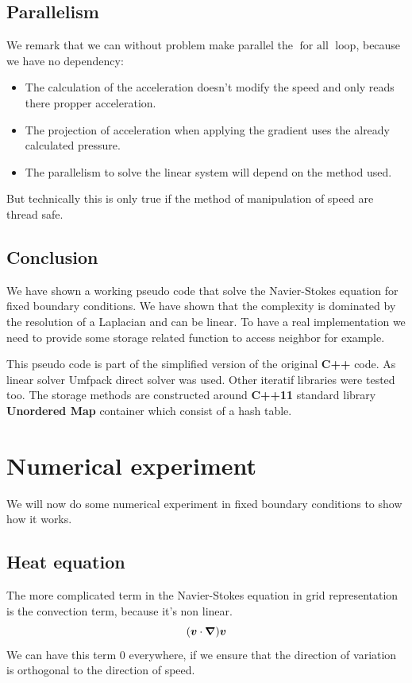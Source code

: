 \subsection{Parallelism}

We remark that we can without problem make parallel the $\mathop{\textbf{for all}}$ loop, because we have no dependency:
\begin{itemize}
 \item The calculation of the acceleration doesn't modify the speed and only reads there propper acceleration.
 \item The projection of acceleration when applying the gradient uses the already calculated pressure.
 \item The parallelism to solve the linear system will depend on the method used.
\end{itemize}

But technically this is only true if the method of manipulation of speed are thread safe.

\subsection{Conclusion}

We have shown a working pseudo code that solve the Navier-Stokes equation for fixed boundary conditions.
We have shown that the complexity is dominated by the resolution of a Laplacian and can be linear.
To have a real implementation we need to provide some storage related function to access neighbor for example.

This pseudo code is part of the simplified version of the original \textbf{C++} code.
As linear solver Umfpack direct solver was used. Other iteratif libraries were tested too.
The storage methods are constructed around \textbf{C++11} standard library \textbf{Unordered Map} container which consist of a hash table.

\FloatBarrier
\section{Numerical experiment}

We will now do some numerical experiment in fixed boundary conditions to show how it works.

\subsection{Heat equation}

The more complicated term in the Navier-Stokes equation in grid representation is the convection term, because it's non linear.
\begin{equation}
	({\boldsymbol {v}}\cdot {\boldsymbol {\nabla}}){\boldsymbol {v}}
\end{equation}
We can have this term $0$ everywhere, if we ensure that the direction of variation is orthogonal to the direction of speed.

